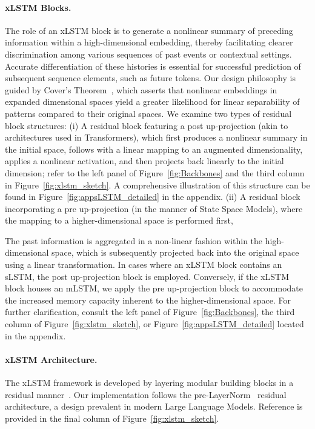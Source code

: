 \paragraph{xLSTM Blocks.}
\label{sec:xLSTMblock}
The role of an xLSTM block is to generate a nonlinear summary of preceding information within a high-dimensional embedding, thereby facilitating clearer discrimination among various sequences of past events or contextual settings. Accurate differentiation of these histories is essential for successful prediction of subsequent sequence elements, such as future tokens. Our design philosophy is guided by Cover’s Theorem~\citep{Cover:65}, which asserts that nonlinear embeddings in expanded dimensional spaces yield a greater likelihood for linear separability of patterns compared to their original spaces. We examine two types of residual block structures: (i) A residual block featuring a post up-projection (akin to architectures used in Transformers), which first produces a nonlinear summary in the initial space, follows with a linear mapping to an augmented dimensionality, applies a nonlinear activation, and then projects back linearly to the initial dimension; refer to the left panel of Figure~\ref{fig:Backbones} and the third column in Figure~\ref{fig:xlstm_sketch}. A comprehensive illustration of this structure can be found in Figure~\ref{fig:appsLSTM_detailed} in the appendix. (ii) A residual block incorporating a pre up-projection (in the manner of State Space Models), where the mapping to a higher-dimensional space is performed first,

The past information is aggregated in a non-linear fashion within the high-dimensional space, which is subsequently projected back into the original space using a linear transformation. In cases where an xLSTM block contains an sLSTM, the post up-projection block is employed. Conversely, if the xLSTM block houses an mLSTM, we apply the pre up-projection block to accommodate the increased memory capacity inherent to the higher-dimensional space. For further clarification, consult the left panel of Figure~\ref{fig:Backbones}, the third column of Figure~\ref{fig:xlstm_sketch}, or Figure~\ref{fig:appsLSTM_detailed} located in the appendix.

\paragraph{xLSTM Architecture.}
\label{sec:xLSTMarchitecure}
The xLSTM framework is developed by layering modular building blocks in a residual manner~\citep{Srivastava:15,He:16}. Our implementation follows the pre-LayerNorm~\citep{Ba:16b} residual architecture, a design prevalent in modern Large Language Models. Reference is provided in the final column of Figure~\ref{fig:xlstm_sketch}.

